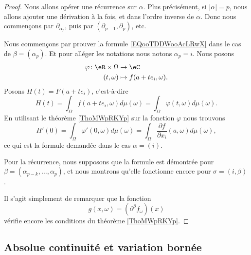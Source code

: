 \begin{proof}
	Nous allons opérer une récurrence sur \( \alpha\). Plus précisément, si \( | \alpha |=p\), nous allons ajouter une dérivation à la fois, et dans l'ordre inverse de \( \alpha\). Donc nous commençons par \( \partial_{\alpha_p}\), puis par \( (\partial_{p-1}, \partial_p)\), etc.

	Nous commençons par prouver la formule \eqref{EQooTDDWooAcLRwX} dans le cas de \( \beta=(\alpha_p)\). Et pour alléger les notations nous notons \( \alpha_p=i\). Nous posons
	\begin{equation}
		\begin{aligned}
			\varphi\colon \eR\times \Omega & \to \eC                   \\
			(t,\omega)                     & \mapsto f(a+te_i,\omega).
		\end{aligned}
	\end{equation}
	Posons \( H(t)=F(a+te_i)\), c'est-à-dire
	\begin{equation}
		H(t)=\int_{\Omega}f(a+te_i,\omega)d\mu(\omega)=\int_{\Omega}\varphi(t,\omega)d\mu(\omega).
	\end{equation}
	En utilisant le théorème \ref{ThoMWpRKYp} sur la fonction \( \varphi\) nous trouvons
	\begin{equation}
		H'(0)=\int_{\Omega}\varphi'(0,\omega)d\mu(\omega)=\int_{\Omega}\frac{ \partial f }{ \partial x_i }(a,\omega)d\mu(\omega),
	\end{equation}
	ce qui est la formule demandée dans le cas \( \alpha=(i)\).

	Pour la récurrence, nous supposons que la formule est démontrée pour \( \beta=(\alpha_{p-k},\ldots, \alpha_p)\), et nous montrons qu'elle fonctionne encore pour \( \sigma=(i, \beta)\).

	Il s'agit simplement de remarquer que la fonction
	\begin{equation}
		g(x,\omega)=(\partial^{\beta}f_{\omega})(x)
	\end{equation}
	vérifie encore les conditions du théorème \ref{ThoMWpRKYp}.
\end{proof}

\subsection{Absolue continuité et variation bornée}

